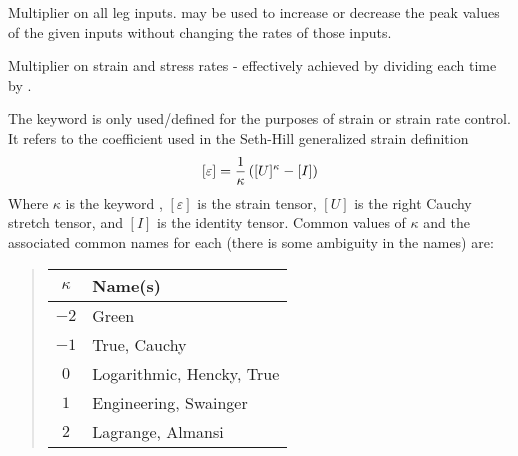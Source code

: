 \documentclass[letterpaper,10pt,english]{sphinxmanual}
\begin{document}
\begin{fulllineitems}
\label{Files/input_file_formatting:ampl}
\end{fulllineitems}


Multiplier on all leg inputs.  may be used to increase or decrease the
peak values of the given inputs without changing the rates of those inputs.
\label{Files/input_file_formatting:ratfac-keyword}

\begin{fulllineitems}
\label{Files/input_file_formatting:ratfac}
\end{fulllineitems}


Multiplier on strain and stress rates - effectively achieved by dividing each
time by .
\label{Files/input_file_formatting:kappa-keyword}

\begin{fulllineitems}
\label{Files/input_file_formatting:kappa}
\end{fulllineitems}


The keyword  is only used/defined for the purposes of strain or strain
rate control. It refers to the coefficient used in the Seth-Hill generalized
strain definition
\begin{gather}
\begin{split}[\varepsilon] = \frac{1}{\kappa}\left( [U]^\kappa - [I]\right)\end{split}\notag
\end{gather}
Where $\kappa$ is the keyword , $[\varepsilon]$ is the
strain tensor, $[U]$ is the right Cauchy stretch tensor, and $[I]$ is
the identity tensor. Common values of $\kappa$ and the associated common
names for each (there is some ambiguity in the names) are:
\begin{quote}

\begin{tabulary}{\linewidth}{|c|l|}
\hline
\textbf{
$\kappa$
} & \textbf{
Name(s)
}\\\hline

$-2$
 & 
Green
\\\hline

$-1$
 & 
True, Cauchy
\\\hline

$0$
 & 
Logarithmic, Hencky, True
\\\hline

$1$
 & 
Engineering, Swainger
\\\hline

$2$
 & 
Lagrange, Almansi
\\\hline
\end{tabulary}

\end{quote}
\end{document}
